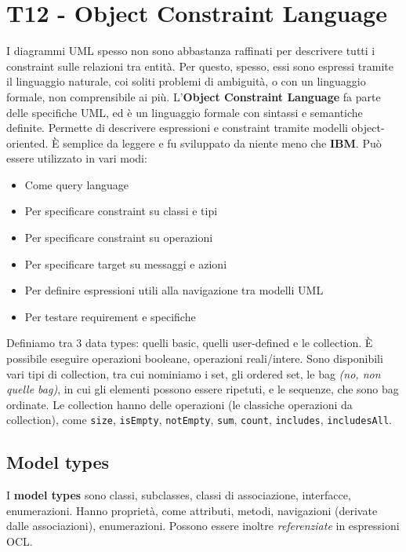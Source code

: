 \documentclass[11pt]{article}
\newcommand{\code}[1]{\texttt{#1}}
\begin{document}
\section{T12 - Object Constraint Language}
I diagrammi UML spesso non sono abbastanza raffinati per descrivere tutti i constraint sulle relazioni tra entità. Per questo, spesso, essi sono espressi tramite il linguaggio naturale, coi soliti problemi di ambiguità, o con un linguaggio formale, non comprensibile ai più. 
L'\textbf{Object Constraint Language} fa parte delle specifiche UML, ed è un linguaggio formale con sintassi e semantiche definite. Permette di descrivere espressioni e constraint tramite modelli object-oriented. È semplice da leggere e fu sviluppato da niente meno che \textbf{IBM}. Può essere utilizzato in vari modi:
\begin{itemize}
    \item Come query language
    \item Per specificare constraint su classi e tipi
    \item Per specificare constraint su operazioni
    \item Per specificare target su messaggi e azioni
    \item Per definire espressioni utili alla navigazione tra modelli UML
    \item Per testare requirement e specifiche
\end{itemize}
Definiamo tra 3 data types: quelli basic, quelli user-defined e le collection. È possibile eseguire operazioni booleane, operazioni reali/intere. Sono disponibili vari tipi di collection, tra cui nominiamo i set, gli ordered set, le bag \textit{(no, non quelle bag)}, in cui gli elementi possono essere ripetuti, e le sequenze, che sono bag ordinate.
Le collection hanno delle operazioni (le classiche operazioni da collection), come \code{size}, \code{isEmpty}, \code{notEmpty}, \code{sum}, \code{count}, \code{includes}, \code{includesAll}.
\subsection{Model types}
I \textbf{model types} sono classi, subclasses, classi di associazione, interfacce, enumerazioni. Hanno proprietà, come attributi, metodi, navigazioni (derivate dalle associazioni), enumerazioni. Possono essere inoltre \textit{referenziate} in espressioni OCL.
\end{document}
